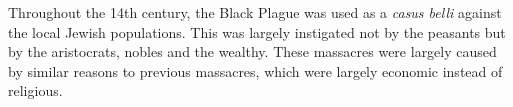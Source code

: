 \documentclass[12pt]{article}
\begin{document}
Throughout the 14th century, the Black Plague was used as a \emph{casus belli} against the local Jewish populations. This was largely instigated not by the peasants but by the aristocrats, nobles and the wealthy.
These massacres were largely caused by similar reasons to previous massacres, which were largely economic instead of religious.
\end{document}
